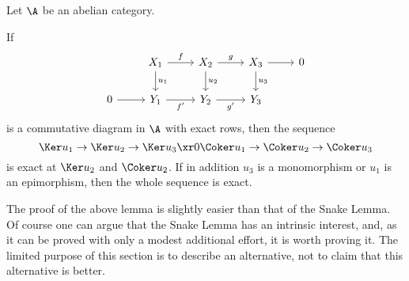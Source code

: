 \documentclass[12pt]{article}
\theoremstyle{remark}
\theoremstyle{definition}
\begin{document}
Let $\A$ be an abelian category. 

\begin{lem}
If 
$$
\begin{tikzcd}
{}&X_1\ar{d}{u_1}\ar{r}{f}&X_2\ar{d}{u_2}\ar{r}{g}&X_3\ar{d}{u_3}\ar{r}&0\\ 
0\ar{r}&Y_1\ar{r}[swap]{f'}&Y_2\ar{r}[swap]{g'}&Y_3
\end{tikzcd}
$$ 
is a commutative diagram in $\A$ with exact rows, then the sequence 
$$
\Ker u_1\to\Ker u_2\to\Ker u_3\xr0\Coker u_1\to\Coker u_2\to\Coker u_3
$$
is exact at $\Ker u_2$ and $\Coker u_2$. If in addition $u_3$ is a monomorphism or $u_1$ is an epimorphism, then the whole sequence is exact.
\end{lem}
The proof of the above lemma is slightly easier than that of the Snake Lemma. Of course one can argue that the Snake Lemma has an intrinsic interest, and, as it can be proved with only a modest additional effort, it is worth proving it. The limited purpose of this section is to describe an alternative, not to claim that this alternative is better.
\end{document}
